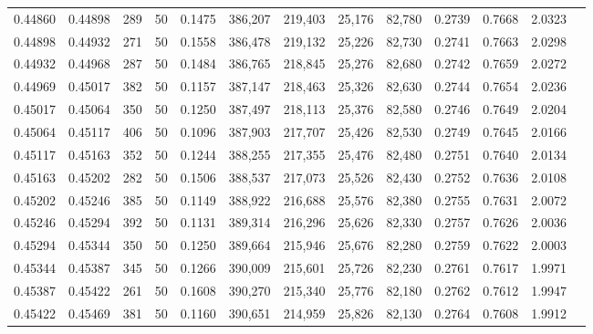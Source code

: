 \begin{tabular}{rrrrrrrrrrrrr}
0.44860 & 0.44898 &   289 &  50 &                                     0.1475 & 386,207 & 219,403 &  25,176 &  82,780 & 0.2739 & 0.7668 & 2.0323 \\
0.44898 & 0.44932 &   271 &  50 &                                     0.1558 & 386,478 & 219,132 &  25,226 &  82,730 & 0.2741 & 0.7663 & 2.0298 \\
0.44932 & 0.44968 &   287 &  50 &                                     0.1484 & 386,765 & 218,845 &  25,276 &  82,680 & 0.2742 & 0.7659 & 2.0272 \\
0.44969 & 0.45017 &   382 &  50 &                                     0.1157 & 387,147 & 218,463 &  25,326 &  82,630 & 0.2744 & 0.7654 & 2.0236 \\
0.45017 & 0.45064 &   350 &  50 &                                     0.1250 & 387,497 & 218,113 &  25,376 &  82,580 & 0.2746 & 0.7649 & 2.0204 \\
0.45064 & 0.45117 &   406 &  50 &                                     0.1096 & 387,903 & 217,707 &  25,426 &  82,530 & 0.2749 & 0.7645 & 2.0166 \\
0.45117 & 0.45163 &   352 &  50 &                                     0.1244 & 388,255 & 217,355 &  25,476 &  82,480 & 0.2751 & 0.7640 & 2.0134 \\
0.45163 & 0.45202 &   282 &  50 &                                     0.1506 & 388,537 & 217,073 &  25,526 &  82,430 & 0.2752 & 0.7636 & 2.0108 \\
0.45202 & 0.45246 &   385 &  50 &                                     0.1149 & 388,922 & 216,688 &  25,576 &  82,380 & 0.2755 & 0.7631 & 2.0072 \\
0.45246 & 0.45294 &   392 &  50 &                                     0.1131 & 389,314 & 216,296 &  25,626 &  82,330 & 0.2757 & 0.7626 & 2.0036 \\
0.45294 & 0.45344 &   350 &  50 &                                     0.1250 & 389,664 & 215,946 &  25,676 &  82,280 & 0.2759 & 0.7622 & 2.0003 \\
0.45344 & 0.45387 &   345 &  50 &                                     0.1266 & 390,009 & 215,601 &  25,726 &  82,230 & 0.2761 & 0.7617 & 1.9971 \\
0.45387 & 0.45422 &   261 &  50 &                                     0.1608 & 390,270 & 215,340 &  25,776 &  82,180 & 0.2762 & 0.7612 & 1.9947 \\
0.45422 & 0.45469 &   381 &  50 &                                     0.1160 & 390,651 & 214,959 &  25,826 &  82,130 & 0.2764 & 0.7608 & 1.9912 \\

\end{tabular}
